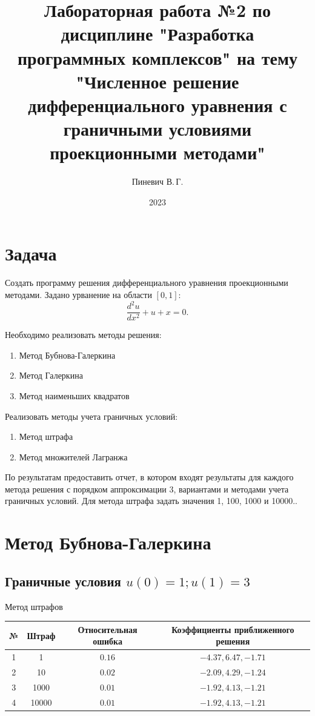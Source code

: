 \documentclass[12pt,a4paper]{article}
\title{Лабораторная работа №2 по дисциплине "Разработка программных комплексов" на тему "Численное решение дифференциального уравнения
	с граничными условиями проекционными методами"}
\author{Пиневич В.\,Г.}
\date{2023}
\begin{document}
    \maketitle
    \tableofcontents
    \pagebreak

    \section{Задача}

    Создать программу решения дифференциального уравнения проекционными методами. Задано урванение на области $[0, 1]\colon$
    \[
        \dfrac{d^2 u}{dx^2} + u + x = 0.
    \]  

    Необходимо реализовать методы решения:
    \begin{enumerate}
        \item Метод Бубнова-Галеркина
        \item Метод Галеркина
        \item Метод наименьших квадратов
    \end{enumerate}
Реализовать методы учета граничных условий:
\begin{enumerate}
	\item Метод штрафа
	\item Метод множителей Лагранжа
\end{enumerate}

    По результатам предоставить отчет, в котором входят результаты для каждого метода
    решения с порядком аппроксимации 3, вариантами и методами учета граничных условий.
    Для метода штрафа задать значения 1, 100, 1000 и 10000..


    \pagebreak

    \section{ Метод Бубнова-Галеркина}
    
   	\subsection{Граничные условия $u(0) = 1; u(1) = 3$}

    \begin{center}
    	Метод штрафов
        \begin{tabular}{|c|c|c|c|} 
         \hline
         № & Штраф & Относительная ошибка & Коэффициенты приближенного решения \\ 
         \hline
         1 & 1 &$0.16$ & ${-4.37,6.47,-1.71}$ \\ 
         \hline
         2 & 10 &$0.02$ & ${-2.09,4.29,-1.24}$ \\ 
         \hline
         3 & 1000 &$0.01$ & ${-1.92,4.13,-1.21}$ \\ 
         \hline
         4 & 10000 &$0.01$ & ${-1.92,4.13,-1.21}$ \\ 
         \hline
        \end{tabular}
    \end{center}
\end{document}
